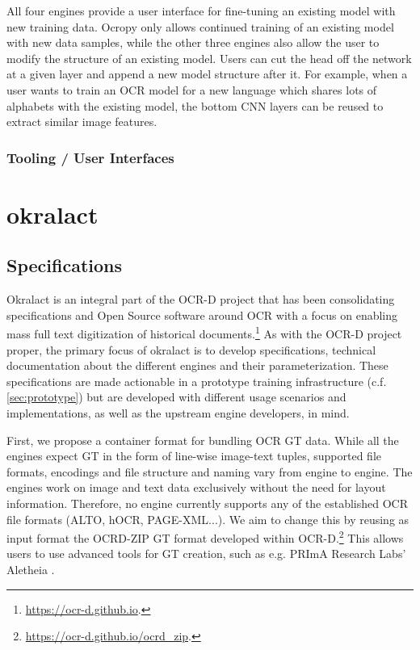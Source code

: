 \documentclass[conference]{IEEEtran}
\begin{document}
All four engines provide a user interface for fine-tuning an
existing model with new training data. Ocropy only allows
continued training of an existing model with new data samples,
while the other three engines also allow the user to modify the
structure of an existing model. Users can cut the head off the
network at a given layer and append a new model structure after it.
For example, when a user wants to train an OCR model for a new
language which shares lots of alphabets with the existing model,
the bottom CNN layers can be reused to extract similar image
features.

\subsubsection*{Tooling / User Interfaces}


\section*{okralact}

\subsection*{Specifications}

Okralact is an integral part of the OCR-D project that has been
consolidating specifications and Open Source software around OCR
with a focus on enabling mass full text digitization of historical
documents.\footnote{\url{https://ocr-d.github.io}.} As with the
OCR-D project proper, the primary focus of okralact is to develop
specifications, technical documentation about the different engines
and their parameterization. These specifications are made
actionable in a prototype training infrastructure (c.f.
\ref{sec:prototype}) but are developed with different usage
scenarios and implementations, as well as the upstream engine
developers, in mind.

First, we propose a container format for bundling OCR GT data.
While all the engines expect GT in the form of line-wise image-text
tuples, supported file formats, encodings and file structure and
naming vary from engine to engine. The engines work on image and
text data exclusively without the need for layout information.
Therefore, no engine currently supports any of the established OCR
file formats (ALTO, hOCR, PAGE-XML...). We aim to change this by
reusing as input format the OCRD-ZIP GT format developed within
OCR-D.\footnote{\url{https://ocr-d.github.io/ocrd_zip}.} This
allows users to use advanced tools for GT creation, such as e.g. 
PRImA Research Labs' Aletheia \cite{clausner2011aletheia}.
\end{document}
